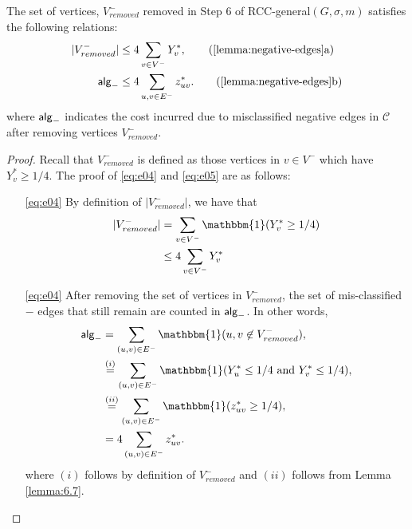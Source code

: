 \begin{lemma} \label{lemma:negative-edges}
The set of vertices, $V^-_{removed}$ removed in Step 6 of {\sf RCC-general}$(G,\sigma,m)$ satisfies the following relations:
\begin{align}
    |V^-_{removed}| &\le 4 \sum_{v \in V^-} Y_v^*, \label{eq:e04} \tag{\ref{lemma:negative-edges}a}\\
    \alg_{-} &\le 4 \sum_{u,v \in E^-} z^*_{uv}. \label{eq:e05} \tag{\ref{lemma:negative-edges}b}
\end{align}
where $\mathsf{alg}_-$ indicates the cost incurred due to misclassified negative edges in $\mathcal{C}$ after removing vertices $V_{removed}^-$.
\end{lemma}
\begin{proof}
Recall that $V_{removed}^-$ is defined as those vertices in $v \in V^-$ which have $Y_v^* \ge 1/4$. The proof of \eqref{eq:e04} and \eqref{eq:e05} are as follows:
\begin{enumerate}
    \item[\eqref{eq:e04}] By definition of $|V_{removed}^-|$, we have that\begin{align*}
        |V_{removed}^-| &= \sum_{v \in V^-} \mathbbm{1} (Y_v^* \ge 1/4)\\
        &\le 4\sum_{v \in V^-} Y_v^*
    \end{align*}
    \item[\eqref{eq:e04}] After removing the set of vertices in $V_{removed}^-$, the set of mis-classified $-$ edges that still remain are counted in $\mathsf{alg}_-$. In other words,
    \begin{align*}
        \alg_- &= \sum_{(u,v) \in E^-} \mathbbm{1} (u,v \not\in V_{removed}^-), \\
        &\overset{(i)}{=} \sum_{(u,v) \in E^-} \mathbbm{1} (Y_u^* \le 1/4 \text{ and } Y_v^*\le 1/4), \\
        &\overset{(ii)}{=} \sum_{(u,v) \in E^-} \mathbbm{1} (z_{uv}^* \ge 1/4), \\
        &= 4\sum_{(u,v) \in E^-} z_{uv}^*.
    \end{align*}
    where $(i)$ follows by definition of $V^-_{removed}$ and $(ii)$ follows from Lemma \ref{lemma:6.7}.
\end{enumerate}
	


\end{proof}
